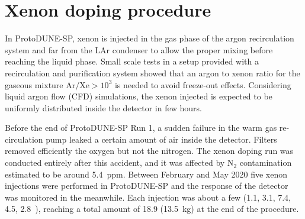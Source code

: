\documentclass[a4paper]{article}
\begin{document}
\section{Xenon doping procedure}
In ProtoDUNE-SP, xenon is injected in the gas phase of the argon recirculation system and far from the LAr condenser to allow the proper mixing before reaching the liquid phase. Small scale tests in a setup provided with a recirculation and purification system showed that an argon to xenon ratio for the gaseous mixture $\text{Ar}/\text{Xe}> 10^3$ is needed to avoid freeze-out effects. Considering liquid argon flow (CFD) simulations, the xenon injected is expected to be uniformly distributed inside the detector in few hours. 


Before the end of ProtoDUNE-SP Run 1, a sudden failure in the warm gas re-circulation pump leaked a certain amount of air inside the detector. Filters removed efficiently the oxygen but not the nitrogen. The xenon doping run was conducted entirely after this accident, and it was affected by N$_2$ contamination estimated to be around \SI{5.4}{ppm}.
Between February and May 2020 five xenon injections were performed in ProtoDUNE-SP and the response of the detector was monitored in the meanwhile. Each injection was about a few \si{\ppm} (1.1, 3.1, 7.4, 4.5, 2.8~\si{\ppm}), reaching a total amount of \SI{18.9}{\ppm} (\SI{13.5}{\kilo\gram}) at the end of the procedure.
\end{document}
